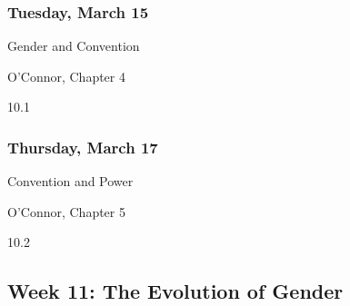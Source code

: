 \documentclass[
]{article}
\providecommand{\tightlist}{%
  \setlength{\itemsep}{0pt}\setlength{\parskip}{0pt}}
\begin{document}
\begin{multicols}{2}

\hypertarget{tuesday-march-15}{%
\subsubsection{Tuesday, March 15}\label{tuesday-march-15}}

\begin{description}
\tightlist
\item[Topic]
Gender and Convention
\item[Reading]
O'Connor, Chapter 4
\item[Video lectures]
10.1
\end{description}

\hypertarget{thursday-march-17}{%
\subsubsection{Thursday, March 17}\label{thursday-march-17}}

\begin{description}
\tightlist
\item[Topic]
Convention and Power
\item[Reading]
O'Connor, Chapter 5
\item[Video lectures]
10.2
\end{description}

\end{multicols}

\hypertarget{week-11-the-evolution-of-gender}{%
\subsection{Week 11: The Evolution of
Gender}\label{week-11-the-evolution-of-gender}}
\end{document}
